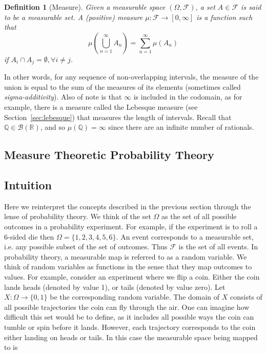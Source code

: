 \documentclass[10pt, oneside]{article}
\newcommand{\R}{\mathbb{R}}
\newcommand{\Q}{\mathbb{Q}}
\newtheorem{defn}{Definition}
\begin{document}
\begin{defn}[Measure]
    \label{defn:measure}
    Given a measurable space $(\Omega,\mathcal{F})$, a set $A\in \mathcal{F}$ is said to be a measurable set.
    A (positive) measure $\mu:\mathcal{F}\to [0,\infty]$ is a function such that $$\mu(\bigcup_{n=1}^{\infty}A_n)=\sum_{n=1}^{\infty}\mu(A_n)$$ if $A_i\cap A_j=\emptyset,\forall i\ne j$. 
\end{defn}
In other words, for any sequence of non-overlapping intervals, the measure of the union is equal to the sum of the measures of its elements (sometimes called \emph{sigma-additivity}).
Also of note is that $\infty$ is included in the codomain, as for example, there is a measure called the Lebesque measure (see Section~\ref{sec:lebesque}) that measures the length of intervals. Recall that $\Q\in\mathcal{B}(\R)$, and so $\mu(\Q)=\infty$ since there are an infinite number of rationals.

\subsection{Measure Theoretic Probability Theory}

\subsection{Intuition}
Here we reinterpret the concepts described in the previous section through the lense of probability theory.
We think of the set $\Omega$ as the set of all possible outcomes in a probability experiment. For example, if the experiment is to roll a 6-sided die then $\Omega=\{1,2,3,4,5,6\}$.
An event corresponds to a measurable set, i.e. any possible subset of the set of outcomes.
Thus $\mathcal{F}$ is the set of all events.
In probability theory, a measurable map is referred to as a random variable.
We think of random variables as functions in the sense that they map outcomes to values.
For example, consider an experiment where we flip a coin. 
Either the coin lands heads (denoted by value 1), or tails (denoted by value zero). 
Let $X:\Omega\to\{0,1\}$ be the corresponding random variable.
The domain of $X$ consists of all possible trajectories the coin can fly through the air. One can imagine how difficult this set would be to define, as it includes all possible ways the coin can tumble or spin before it lands.
However, each trajectory corresponds to the coin either landing on heads or tails.
In this case the measurable space being mapped to is 
\end{document}
